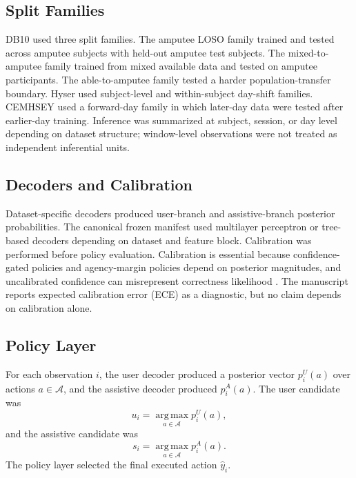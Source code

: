 \documentclass[journal]{IEEEtran}
\newcommand{\argmax}{\operatorname*{arg\,max}}
\begin{document}
\subsection{Split Families}
DB10 used three split families. The amputee LOSO family trained and tested across amputee subjects with held-out amputee test subjects. The mixed-to-amputee family trained from mixed available data and tested on amputee participants. The able-to-amputee family tested a harder population-transfer boundary. Hyser used subject-level and within-subject day-shift families. CEMHSEY used a forward-day family in which later-day data were tested after earlier-day training. Inference was summarized at subject, session, or day level depending on dataset structure; window-level observations were not treated as independent inferential units.

\subsection{Decoders and Calibration}
Dataset-specific decoders produced user-branch and assistive-branch posterior probabilities. The canonical frozen manifest used multilayer perceptron or tree-based decoders depending on dataset and feature block. Calibration was performed before policy evaluation. Calibration is essential because confidence-gated policies and agency-margin policies depend on posterior magnitudes, and uncalibrated confidence can misrepresent correctness likelihood \cite{Guo2017Calibration}. The manuscript reports expected calibration error (ECE) as a diagnostic, but no claim depends on calibration alone.

\subsection{Policy Layer}
For each observation $i$, the user decoder produced a posterior vector $p_i^U(a)$ over actions $a \in \mathcal{A}$, and the assistive decoder produced $p_i^A(a)$. The user candidate was
\begin{equation}
    u_i = \argmax_{a \in \mathcal{A}} p_i^U(a),
\end{equation}
and the assistive candidate was
\begin{equation}
    s_i = \argmax_{a \in \mathcal{A}} p_i^A(a).
\end{equation}
The policy layer selected the final executed action $\hat{y}_i$.
\end{document}
